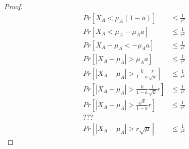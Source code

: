 \begin{proof}

    \begin{align*}
        &Pr[X_A < \mu_A(1-a)] &\le \frac{1}{r^2}\\ 
        &Pr[X_A < \mu_A - \mu_A a] &\le \frac{1}{r^2}\\
        &Pr[X_A - \mu_A < - \mu_A a] &\le \frac{1}{r^2}\\
        &Pr[|X_A - \mu_A| > \mu_A a] &\le \frac{1}{r^2}\\
        &Pr[|X_A - \mu_A| > \frac{k}{1-a} \frac{r}{\sqrt{k}}]   &\le \frac{1}{r^2}\\
        &Pr[|X_A - \mu_A| > \frac{k}{1-a} \frac{1}{\sqrt{k}} r] &\le \frac{1}{r^2}\\
        &Pr[|X_A - \mu_A| > \frac{\sqrt{k}}{1-a} r]&\le \frac{1}{r^2}\\
        &???&\\
        &Pr[|X_A - \mu_A| > r \sqrt{\mu}] &\le \frac{1}{r^2}
    \end{align*}

\end{proof}
